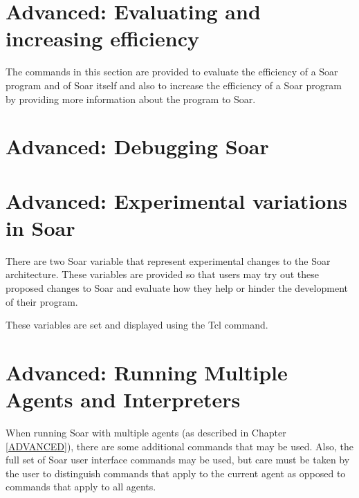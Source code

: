 {\section{Advanced: Evaluating and increasing efficiency}

The commands in this section are provided to evaluate the efficiency of a Soar
program and of Soar itself and also to increase the efficiency of a Soar
program by providing more information about the program to Soar.

\section{Advanced: Debugging Soar}

\section{Advanced: Experimental variations in Soar}

There are two Soar variable that represent experimental changes to the Soar
architecture. These variables are provided so that users may try out these
proposed changes to Soar and evaluate how they help or hinder the development
of their program.

These variables are set and displayed using the Tcl  command.



\section{Advanced: Running Multiple Agents and Interpreters}
\label{INTERFACE-advanced-multiple}

When running Soar with multiple agents (as described in Chapter
\ref{ADVANCED}), there are some additional commands that may be used. Also, 
the full set of Soar user interface commands may be used, but care must be
taken by the user to distinguish commands that apply to the current agent as
opposed to commands that apply to all agents.

}
